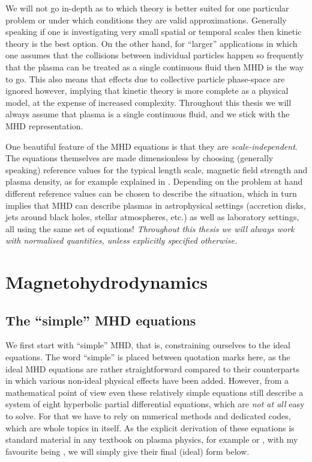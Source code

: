 We will not go in-depth as to which theory is better suited for one particular problem or under which conditions they are valid approximations. Generally speaking if one is investigating very small spatial or temporal scales then kinetic theory is the best option. On the other hand, for ``larger'' applications in which one assumes that the collisions between individual particles happen so frequently that the plasma can be treated as a single continuous fluid then MHD is the way to go. This also means that effects due to collective particle phase-space are ignored however, implying that kinetic theory is more complete as a physical model, at the expense of increased complexity. Throughout this thesis we will always assume that plasma is a single continuous fluid, and we stick with the MHD representation.

One beautiful feature of the MHD equations is that they are \emph{scale-independent}. The equations themselves are made dimensionless by choosing (generally speaking) reference values for the typical length scale, magnetic field strength and plasma density, as for example explained in \citet[Chapter 4]{book_MHD}. Depending on the problem at hand different reference values can be chosen to describe the situation, which in turn implies that MHD can describe plasmas in astrophysical settings (accretion disks, jets around black holes, stellar atmospheres, etc.) as well as laboratory settings, all using the same set of equations!
\emph{Throughout this thesis we will always work with normalised quantities, unless explicitly specified otherwise.}


\section{Magnetohydrodynamics}
\subsection{The ``simple'' MHD equations}
We first start with ``simple'' MHD, that is, constraining ourselves to the ideal equations. The word ``simple'' is placed between quotation marks here, as the ideal MHD equations are rather straightforward compared to their counterparts in which various non-ideal physical effects have been added. However, from a mathematical point of view even these relatively simple equations still describe a system of eight hyperbolic partial differential equations, which are \emph{not at all} easy to solve. For that we have to rely on numerical methods and dedicated codes, which are whole topics in itself. As the explicit derivation of these equations is standard material in any textbook on plasma physics, for example \citet{book_priest, book_davidson} or \citet{book_choudhuri}, with my favourite being \citet{book_MHD}, we will simply give their final (ideal) form below.

